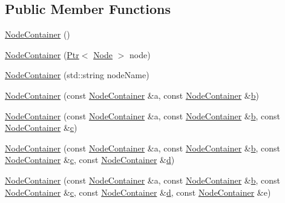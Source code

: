 \subsection*{Public Member Functions}
\begin{DoxyCompactItemize}
\item 
\hyperlink{classns3_1_1NodeContainer_afe356d8a96fc9b0e6455f0a4a5d72a67}{Node\+Container} ()
\item 
\hyperlink{classns3_1_1NodeContainer_a94c21d37b042fb58a078d61aa4f0ea99}{Node\+Container} (\hyperlink{classns3_1_1Ptr}{Ptr}$<$ \hyperlink{classns3_1_1Node}{Node} $>$ node)
\item 
\hyperlink{classns3_1_1NodeContainer_a524265b93f1064dd4d3fab33ee251b1f}{Node\+Container} (std\+::string node\+Name)
\item 
\hyperlink{classns3_1_1NodeContainer_a4d67af970a0a069c3b0bee985ced72ca}{Node\+Container} (const \hyperlink{classns3_1_1NodeContainer}{Node\+Container} \&a, const \hyperlink{classns3_1_1NodeContainer}{Node\+Container} \&\hyperlink{lte__pathloss_8m_a21ad0bd836b90d08f4cf640b4c298e7c}{b})
\item 
\hyperlink{classns3_1_1NodeContainer_aa9237bce9564ece03749c9e432f10bc8}{Node\+Container} (const \hyperlink{classns3_1_1NodeContainer}{Node\+Container} \&a, const \hyperlink{classns3_1_1NodeContainer}{Node\+Container} \&\hyperlink{lte__pathloss_8m_a21ad0bd836b90d08f4cf640b4c298e7c}{b}, const \hyperlink{classns3_1_1NodeContainer}{Node\+Container} \&\hyperlink{mmwave_2model_2fading-traces_2fading__trace__generator_8m_ae0323a9039add2978bf5b49550572c7c}{c})
\item 
\hyperlink{classns3_1_1NodeContainer_aacbd9d9dec6b6882a900cc94d4a02f4d}{Node\+Container} (const \hyperlink{classns3_1_1NodeContainer}{Node\+Container} \&a, const \hyperlink{classns3_1_1NodeContainer}{Node\+Container} \&\hyperlink{lte__pathloss_8m_a21ad0bd836b90d08f4cf640b4c298e7c}{b}, const \hyperlink{classns3_1_1NodeContainer}{Node\+Container} \&\hyperlink{mmwave_2model_2fading-traces_2fading__trace__generator_8m_ae0323a9039add2978bf5b49550572c7c}{c}, const \hyperlink{classns3_1_1NodeContainer}{Node\+Container} \&\hyperlink{lte__pathloss_8m_a1aabac6d068eef6a7bad3fdf50a05cc8}{d})
\item 
\hyperlink{classns3_1_1NodeContainer_a6e15fc3e2059c9936ed0d37c5fa3851c}{Node\+Container} (const \hyperlink{classns3_1_1NodeContainer}{Node\+Container} \&a, const \hyperlink{classns3_1_1NodeContainer}{Node\+Container} \&\hyperlink{lte__pathloss_8m_a21ad0bd836b90d08f4cf640b4c298e7c}{b}, const \hyperlink{classns3_1_1NodeContainer}{Node\+Container} \&\hyperlink{mmwave_2model_2fading-traces_2fading__trace__generator_8m_ae0323a9039add2978bf5b49550572c7c}{c}, const \hyperlink{classns3_1_1NodeContainer}{Node\+Container} \&\hyperlink{lte__pathloss_8m_a1aabac6d068eef6a7bad3fdf50a05cc8}{d}, const \hyperlink{classns3_1_1NodeContainer}{Node\+Container} \&e)

\end{DoxyCompactItemize}
